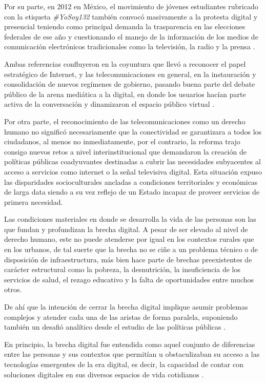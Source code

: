 \documentclass[
  spanish,
  11pt,
  a4paper,
]{scrbook}
\begin{document}
Por su parte, en 2012 en México, el movimiento de jóvenes estudiantes
rubricado con la etiqueta \emph{\#YoSoy132} también convocó masivamente
a la protesta digital y presencial teniendo como principal demanda la
trasparencia en las elecciones federales de ese año y cuestionando el
manejo de la información de los medios de comunicación electrónicos
tradicionales como la televisión, la radio y la prensa
\autocite{Candon2013,Torres2015,Rivera2014,Welp2015}.

Ambas referencias confluyeron en la coyuntura que llevó a reconocer el
papel estratégico de Internet, y las telecomunicaciones en general, en
la instauración y consolidación de nuevos regímenes de gobierno, pasando
buena parte del debate público de la arena mediática a la digital, en
donde los usuarios hacían parte activa de la conversación y dinamizaron
el espacio público virtual \autocite{Howard2013}.

Por otra parte, el reconocimiento de las telecomunicaciones como un
derecho humano no significó necesariamente que la conectividad se
garantizara a todos los ciudadanos, al menos no inmediatamente, por el
contrario, la reforma trajo consigo nuevos retos a nivel
interinstitucional que demandaron la creación de políticas públicas
coadyuvantes destinadas a cubrir las necesidades subyacentes al acceso a
servicios como internet o la señal televisiva digital. Esta situación
expuso las disparidades socioculturales ancladas a condiciones
territoriales y económicas de larga data siendo a su vez reflejo de un
Estado incapaz de proveer servicios de primera necesidad.

Las condiciones materiales en donde se desarrolla la vida de las
personas son las que fundan y profundizan la brecha digital. A pesar de
ser elevado al nivel de derecho humano, este no puede atenderse por
igual en los contextos rurales que en los urbanos, de tal suerte que la
brecha no se ciñe a un problema técnico o de disposición de
infraestructura, más bien hace parte de brechas preexistentes de
carácter estructural como la pobreza, la desnutrición, la insuficiencia
de los servicios de salud, el rezago educativo y la falta de
oportunidades entre muchos otros.

De ahí que la intención de cerrar la brecha digital implique asumir
problemas complejos y atender cada una de las aristas de forma paralela,
suponiendo también un desafió analítico desde el estudio de las
políticas públicas \autocite{Pimienta2007,Olarte2017}.

En principio, la brecha digital fue entendida como aquel conjunto de
diferencias entre las personas y sus contextos que permitían u
obstaculizaban su acceso a las tecnologías emergentes de la era digital,
es decir, la capacidad de contar con soluciones digitales en sus
diversos espacios de vida cotidianos
\autocite{Warschauer2010,Rodriguez2006,Katz2019}.
\end{document}
